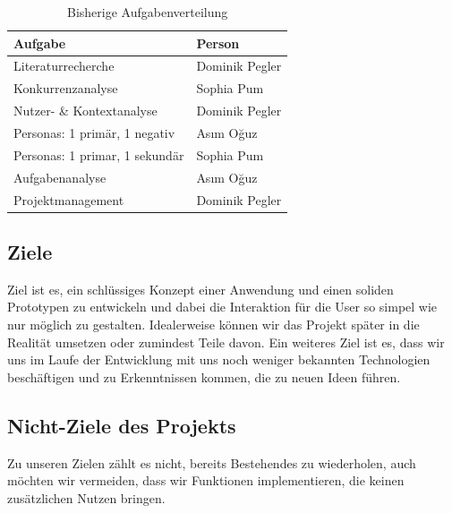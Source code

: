 \documentclass[12pt,paper=a4,oneside,hidelinks,headings=small,captions=heading,captions=nooneline]{scrartcl}
\begin{document}
\begin{table}[htbp]
\caption{\label{tbl:tasks}Bisherige Aufgabenverteilung}
\centering
\begin{tabular}{ll}
\toprule
Aufgabe & Person\\
\midrule
Literaturrecherche & Dominik Pegler\\
Konkurrenzanalyse & Sophia Pum\\
Nutzer- \& Kontextanalyse & Dominik Pegler\\
Personas: 1 primär, 1 negativ & Asım Oğuz\\
Personas: 1 primar, 1 sekundär & Sophia Pum\\
Aufgabenanalyse & Asım Oğuz\\
Projektmanagement & Dominik Pegler\\
\bottomrule
\end{tabular}
\end{table}

\subsection{Ziele}
\label{sec:orge48527d}

Ziel ist es, ein schlüssiges Konzept einer Anwendung und einen soliden
Prototypen zu entwickeln und dabei die Interaktion für die User so
simpel wie nur möglich zu gestalten. Idealerweise können wir das
Projekt später in die Realität umsetzen oder zumindest Teile
davon. Ein weiteres Ziel ist es, dass wir uns im Laufe der Entwicklung
mit uns noch weniger bekannten Technologien beschäftigen und zu
Erkenntnissen kommen, die zu neuen Ideen führen.

\subsection{Nicht-Ziele des Projekts}
\label{sec:org47dab92}

Zu unseren Zielen zählt es nicht, bereits Bestehendes zu wiederholen,
auch möchten wir vermeiden, dass wir Funktionen implementieren, die
keinen zusätzlichen Nutzen bringen.
\end{document}
